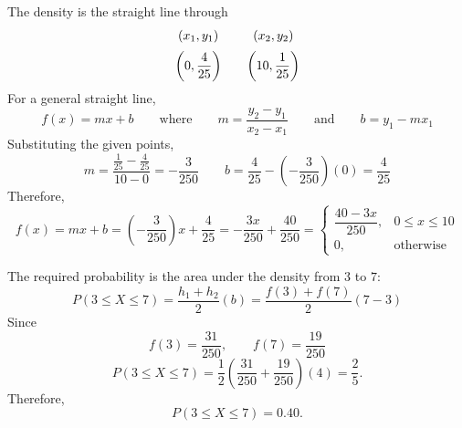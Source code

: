 {		
		The density is the straight line through
		\[
		\begin{array}{c@{\qquad}c}
			(x_1,y_1) & (x_2,y_2) \\[2mm]
			\left(0,\dfrac{4}{25}\right)
			&
			\left(10,\dfrac{1}{25}\right)
		\end{array}
		\]
		For a general straight line,
		\[
		f(x)=mx+b
		\qquad
		\text{where}
		\qquad
		m=\frac{y_2-y_1}{x_2-x_1}
		\qquad\text{and}\qquad
		b=y_1-mx_1
		\]
		Substituting the given points,
		\[
		m=
		\frac{\frac1{25}-\frac4{25}}{10-0}
		=
		-\frac3{250}
		\qquad
		b=\frac4{25}-\left(-\frac3{250}\right)(0)
		=
		\frac4{25}
		\]
		Therefore,
		\[
		f(x) =mx+b =
		\left( -\frac3{250} \right) x+\frac4{25}
		=
		-\frac{3x}{250}+\frac{40}{250}
		=
		\begin{cases}
			\dfrac{40-3x}{250},&0\le x\le10\\[1mm]
			0,&\text{otherwise}
		\end{cases}
		\]
		

		The required probability is the area under the density from \(3\) to \(7\):
		\[
		P(3\le X\le7)
		=\frac{h_1+h_2}{2} (b) =
		\frac{
			f(3)+f(7)
		}{2}(7-3)		
		\]
		Since
		\[
		f(3)=\frac{31}{250},
		\qquad
		f(7)=\frac{19}{250}
		\]
		\[
		P(3\le X\le7)
		=
		\frac12
		\left(
		\frac{31}{250}+\frac{19}{250}
		\right)(4)
		=
		\frac25.
		\]
		Therefore,
		\[
		\boxed{P(3\le X\le7)=0.40}.
		\]
		
		
		\vspace{-5mm}
		
	}
	
